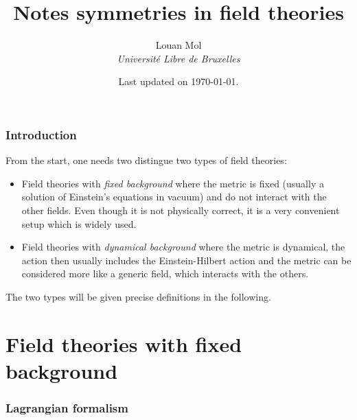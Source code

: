 \documentclass[a4paper,10pt]{article}
\title{\vspace{-2cm}\textbf{Notes symmetries in field theories}}
\author{Louan Mol\\ \textit{Université Libre de Bruxelles}}
\date{Last updated on \today.}
\begin{document}
\maketitle

\tableofcontents

\section{Introduction}

    From the start, one needs two distingue two types of field theories:
    \begin{itemize}
        \item Field theories with \emph{fixed background} where the metric is fixed (usually a solution of Einstein's equations in vacuum) and do not interact with the other fields. Even though it is not physically correct, it is a very convenient setup which is widely used.
        \item Field theories with \emph{dynamical background} where the metric is dynamical, the action then usually includes the Einstein-Hilbert action and the metric can be considered more like a generic field, which interacts with the others.
    \end{itemize}
    The two types will be given precise definitions in the following.

\part{Field theories with fixed background}

\section{Lagrangian formalism}
\end{document}

